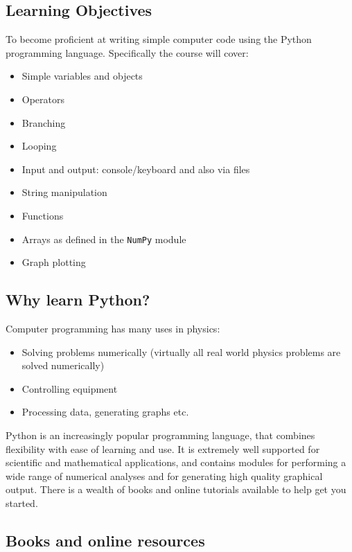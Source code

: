 \documentclass[10pt]{article}
\providecommand{\tightlist}{%
      \setlength{\itemsep}{0pt}\setlength{\parskip}{0pt}}
\begin{document}
    \hypertarget{learning-objectives}{%
\subsection{Learning Objectives}\label{learning-objectives}}

To become proficient at writing simple computer code using the Python
programming language. Specifically the course will cover:

\begin{itemize}
\tightlist
\item
  Simple variables and objects
\item
  Operators
\item
  Branching
\item
  Looping
\item
  Input and output: console/keyboard and also via files
\item
  String manipulation
\item
  Functions
\item
  Arrays as defined in the \texttt{NumPy} module
\item
  Graph plotting
\end{itemize}

    \hypertarget{why-learn-python}{%
\subsection{Why learn Python?}\label{why-learn-python}}

Computer programming has many uses in physics: \begin{itemize}
\item Solving problems
numerically (virtually all real world physics problems are solved
numerically) 
\item Controlling equipment 
\item Processing data, generating
graphs etc.

\end{itemize}

Python is an increasingly popular programming language, that combines
flexibility with ease of learning and use. It is extremely well
supported for scientific and mathematical applications, and contains
modules for performing a wide range of numerical analyses and for
generating high quality graphical output. There is a wealth of books and
online tutorials available to help get you started.

    \hypertarget{books-and-online-resources}{%
\subsection{Books and online
resources}\label{books-and-online-resources}}
\end{document}
